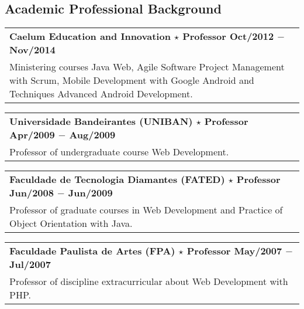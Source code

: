 \documentclass[a4paper, oneside, final]{scrartcl}
\newcommand{\vspc}{\vspace{0.15cm}} %
\begin{document}
\begin{center}
\section{Academic Professional Background}
\begin{tabularx}{1\linewidth}{X}
{\bf Caelum Education and Innovation $\star$ Professor \hfill Oct/2012 $-$ Nov/2014} \\
Ministering courses Java Web, Agile Software Project Management with Scrum, Mobile Development with Google Android and Techniques Advanced Android Development. \vspc\\
\end{tabularx}

\begin{tabularx}{1\linewidth}{X}
{\bf Universidade Bandeirantes (UNIBAN) $\star$ Professor \hfill Apr/2009 $-$ Aug/2009} \\
Professor of undergraduate course Web Development. \vspc\\
\end{tabularx}

\begin{tabularx}{1\linewidth}{X}
{\bf Faculdade de Tecnologia Diamantes (FATED) $\star$ Professor \hfill Jun/2008 $-$ Jun/2009} \\
Professor of graduate courses in Web Development and Practice of Object Orientation with Java. \vspc\\
\end{tabularx}

\begin{tabularx}{1\linewidth}{X}
{\bf Faculdade Paulista de Artes (FPA) $\star$ Professor  \hfill May/2007 $-$ Jul/2007} \\
Professor of discipline extracurricular about Web Development with PHP. \vspc\\
\end{tabularx}


\end{center}
\end{document}
